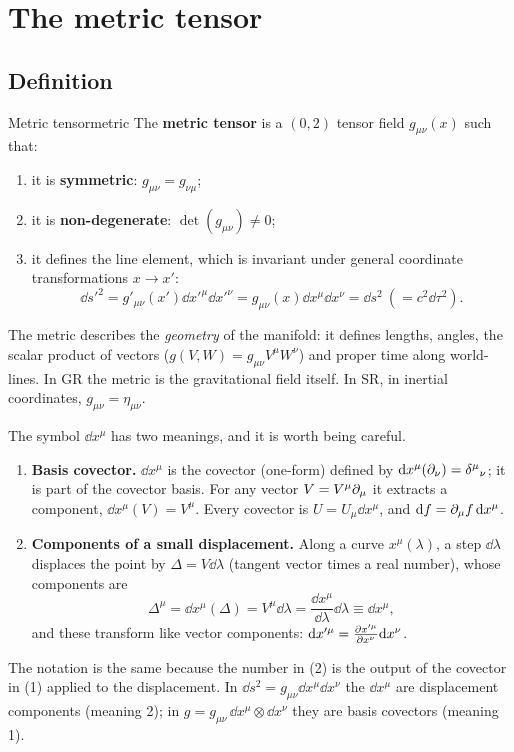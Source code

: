 \chapter{The metric tensor}\label{ch:metric}

\section{Definition}

\begin{definition}{Metric tensor}{metric}
The \textbf{metric tensor} is a $(0,2)$ tensor field $g_{\mu\nu}(x)$ such that:
\begin{enumerate}[label=(\roman*),nosep]
  \item it is \textbf{symmetric}: $g_{\mu\nu}=g_{\nu\mu}$;
  \item it is \textbf{non-degenerate}: $\det(g_{\mu\nu})\neq0$;
  \item it defines the line element, which is invariant under general coordinate transformations $x\to x'$:
  \begin{equation}
    \dd s'^2=g'_{\mu\nu}(x')\dd x'^\mu\dd x'^\nu=g_{\mu\nu}(x)\dd x^\mu\dd x^\nu=\dd s^2\ (=c^2\dd\tau^2).
  \end{equation}
\end{enumerate}
\end{definition}
The metric describes the \emph{geometry} of the manifold: it defines lengths, angles, the scalar product of vectors ($g(V,W)=g_{\mu\nu}V^\mu W^\nu$) and proper time along world-lines. In GR the metric is the gravitational field itself. In SR, in inertial coordinates, $g_{\mu\nu}=\eta_{\mu\nu}$.

\begin{remarkbox}
The symbol $\dd x^\mu$ has two meanings, and it is worth being careful.
\begin{enumerate}
\item \textbf{Basis covector.} $\dd x^\mu$ is the covector (one-form) defined by $\mathrm{d} x^\mu(\partial_\nu)=\delta^\mu{}_\nu$; it is part of the covector basis. For any vector $V=V^\mu\partial_\mu$ it extracts a component, $\dd x^\mu(V)=V^\mu$. Every covector is $U=U_\mu\dd x^\mu$, and $\mathrm{d} f=\partial_\mu f\,\mathrm{d} x^\mu$.
\item \textbf{Components of a small displacement.} Along a curve $x^\mu(\lambda)$, a step $\dd\lambda$ displaces the point by $\Delta=V\dd\lambda$ (tangent vector times a real number), whose components are
\[
  \Delta^\mu=\dd x^\mu(\Delta)=V^\mu\dd\lambda=\frac{\dd x^\mu}{\dd\lambda}\dd\lambda\equiv\dd x^\mu ,
\]
and these transform like vector components: $\mathrm{d} x'^\mu=\frac{\partial x'^\mu}{\partial x^\nu}\mathrm{d} x^\nu$.
\end{enumerate}
The notation is the same because the number in (2) is the output of the covector in (1) applied to the displacement. In $\dd s^2=g_{\mu\nu}\dd x^\mu\dd x^\nu$ the $\dd x^\mu$ are displacement components (meaning 2); in $g=g_{\mu\nu}\,\dd x^\mu\otimes\dd x^\nu$ they are basis covectors (meaning 1).
\end{remarkbox}

